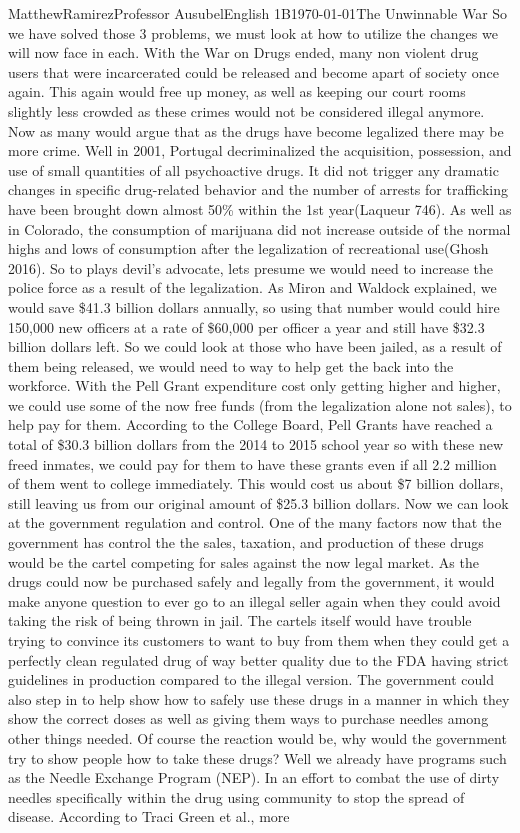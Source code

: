 \documentclass[12pt,letterpaper]{article}
\begin{document}
\begin{mla}{Matthew}{Ramirez}{Professor Ausubel}{English 1B}{\today}{The Unwinnable War}
So we have solved those 3 problems, we must look at how to utilize the changes we will now face in each. With the War on Drugs ended, many non violent drug users that were incarcerated could be released and become apart of society once again. This again would free up money, as well as keeping our court rooms slightly less crowded as these crimes would not be considered illegal anymore. Now as many would argue that as the drugs have become legalized there may be more crime. Well in 2001, Portugal decriminalized the acquisition, possession, and use of small quantities of all psychoactive drugs. It did not trigger any dramatic changes in specific drug-related behavior and the number of arrests for trafficking have been brought down almost 50\% within the 1st year(Laqueur 746). As well as in Colorado, the consumption of marijuana did not increase outside of the normal highs and lows of consumption after the legalization of recreational use(Ghosh 2016). So to plays devil's advocate, lets presume we would need to increase the police force as a result of the legalization. As Miron and Waldock explained, we would save \$41.3 billion dollars annually, so using that number would could hire 150,000 new officers at a rate of \$60,000 per officer a year and still have \$32.3 billion dollars left. So we could look at those who have been jailed, as a result of them being released, we would need to way to help get the back into the workforce. With the Pell Grant expenditure cost only getting higher and higher, we could use some of the now free funds (from the legalization alone not sales), to help pay for them. According to the College Board, Pell Grants have reached a total of \$30.3 billion dollars from the 2014 to 2015 school year so with these new freed inmates, we could pay for them to have these grants even if all 2.2 million of them went to college immediately. This would cost us about \$7 billion dollars, still leaving us from our original amount of \$25.3 billion dollars. Now we can look at the government regulation and control. One of the many factors now that the government has control the the sales, taxation, and production of these drugs would be the cartel competing for sales against the now legal market. As the drugs could now be purchased safely and legally from the government, it would make anyone question to ever go to an illegal seller again when they could avoid taking the risk of being thrown in jail. The cartels itself would have trouble trying to convince its customers to want to buy from them when they could get a perfectly clean regulated drug of way better quality due to the FDA having strict guidelines in production compared to the illegal version. The government could also step in to help show how to safely use these drugs in a manner in which they show the correct doses as well as giving them ways to purchase needles among other things needed. Of course the reaction would be, why would the government try to show people how to take these drugs? Well we already have programs such as the Needle Exchange Program (NEP). In an effort to combat the use of dirty needles specifically within the drug using community to stop the spread of disease. According to Traci Green et al., more 
\end{mla}
\end{document}
